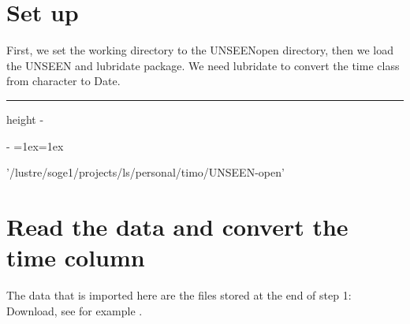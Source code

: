 \documentclass[letterpaper,10pt,english]{sphinxmanual}
\makeatletter
\newenvironment{nbsphinxfancyoutput}{%
    \let\sphinxincludegraphics\nbsphinxincludegraphics
    \nbsphinx@image@maxheight\textheight
    \advance\nbsphinx@image@maxheight -2\fboxsep   %
    \advance\nbsphinx@image@maxheight -2\fboxrule  %
    \advance\nbsphinx@image@maxheight -\baselineskip
\def\nbsphinxfcolorbox{\spx@fcolorbox{nbsphinx-code-border}{white}}%
\def\FrameCommand{\nbsphinxfcolorbox\nbsphinxfancyaddprompt\@empty}%
\def\FirstFrameCommand{\nbsphinxfcolorbox\nbsphinxfancyaddprompt\sphinxVerbatim@Continues}%
\def\MidFrameCommand{\nbsphinxfcolorbox\sphinxVerbatim@Continued\sphinxVerbatim@Continues}%
\def\LastFrameCommand{\nbsphinxfcolorbox\sphinxVerbatim@Continued\@empty}%
\MakeFramed{\advance\hsize-\width\@totalleftmargin\z@\linewidth\hsize\@setminipage}%
\lineskip=1ex\lineskiplimit=1ex\raggedright%
}{\par\unskip\@minipagefalse\endMakeFramed}
\def\nbsphinxfancyaddprompt{\ifvoid\nbsphinxpromptbox\else
    \kern\fboxrule\kern\fboxsep
    \copy\nbsphinxpromptbox
    \kern-\ht\nbsphinxpromptbox\kern-\dp\nbsphinxpromptbox
    \kern-\fboxsep\kern-\fboxrule\nointerlineskip
    \fi}
\newlength\nbsphinxcodecellspacing
\newcommand*{\nbsphinxincludegraphics}[2][]{%
    \gdef\spx@includegraphics@options{#1}%
    \setbox\spx@image@box\hbox{\texttt{[image: \#2]}}%
    \in@false
    \ifdim \wd\spx@image@box>\linewidth
      \g@addto@macro\spx@includegraphics@options{,width=\linewidth}%
      \in@true
    \fi
    \ifdim \ht\spx@image@box>\nbsphinx@image@maxheight
      \g@addto@macro\spx@includegraphics@options{,height=\nbsphinx@image@maxheight}%
      \in@true
    \fi
    \ifin@
      \g@addto@macro\spx@includegraphics@options{,keepaspectratio}%
    \fi
    \setbox\spx@image@box\box\voidb@x %
    \expandafter\includegraphics\expandafter[\spx@includegraphics@options]{#2}%
}%
\makeatother
\begin{document}
\section{Set up}
\label{\detokenize{Notebooks/3.Evaluate/3.Evaluate:Set-up}}
First, we set the working directory to the UNSEEN\sphinxhyphen{}open directory, then we load the UNSEEN and lubridate package. We need lubridate to convert the time class from character to Date.

{
\begin{sphinxVerbatim}[commandchars=\\\{\}]
\llap{\color{nbsphinxin}[1]:\,\hspace{\fboxrule}\hspace{\fboxsep}}
\end{sphinxVerbatim}
}

\hrule height -\fboxrule\relax
\vspace{\nbsphinxcodecellspacing}

\makeatletter\setbox\nbsphinxpromptbox\box\voidb@x\makeatother

\begin{nbsphinxfancyoutput}
'/lustre/soge1/projects/ls/personal/timo/UNSEEN-open'
\end{nbsphinxfancyoutput}

{
\begin{sphinxVerbatim}[commandchars=\\\{\}]
\llap{\color{nbsphinxin}[2]:\,\hspace{\fboxrule}\hspace{\fboxsep}}
\end{sphinxVerbatim}
}


\section{Read the data and convert the time column}
\label{\detokenize{Notebooks/3.Evaluate/3.Evaluate:Read-the-data-and-convert-the-time-column}}
The data that is imported here are the files stored at the end of step 1: Download, see for example .
\end{document}
